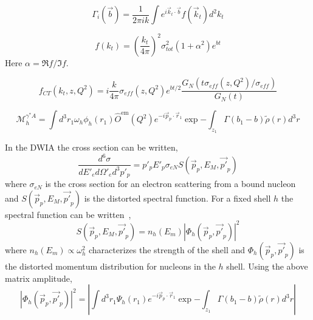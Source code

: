 \begin{equation}
    \Gamma_i(\vec{b}) = \frac{1}{2\pi i k}
                  \int e^{i\vec{k}_t \cdot \vec{b}} f(\vec{k}_t) d^2k_t
\end{equation}

\begin{equation}
    f(k_t) = \left(\frac{k_t}{4\pi}\right)^2
             \sigma_{tot}^2
             (1+\alpha^2) e^{bt}
\end{equation}
Here $\alpha=\Re{f}/\Im{f}$.

\begin{equation}
    f_{CT}(k_t, z, Q^2) = i\frac{k}{4\pi} \sigma_{eff}(z,Q^2) e^{bt/2}
                          \frac{G_N\left( t \sigma_{eff}(z,Q^2)/\sigma_{eff} \right)}
                               {G_N\left( t \right)}
\end{equation}

\begin{equation}
    \mathcal{M}_{h}^{\gamma^*A} = \int d^3 r_1 \omega_h \phi_h\left(r_{1}\right)
                                  \hat{O}^{\mathrm{em}}\left(Q^{2}\right)
                                  e^{-i \vec{p}_p \cdot \vec{r}_1}
                                  \exp{- \int_{z_{1}}
                                  \Gamma\left(b_{1}-b\right) \tilde{\rho}(r) d^3 r}
\end{equation}

In the DWIA the cross section can be
written,
\begin{equation}
    \frac{d^6\sigma}{dE'_{e} d\Omega'_{e} d^3p'_{p}} = p'_p E'_p \sigma_{eN} S(\vec{p}_p, E_M, \vec{p'}_p)
\end{equation}
where $\sigma_{eN}$ is the cross section for an electron scattering from a
bound nucleon and $S(\vec{p}_p, E_M, \vec{p'}_p)$ is the distorted
spectral function.
For a fixed shell $h$ the spectral function can be written~\cite{Frullani_1984},
\begin{equation}
    S(\vec{p}_p, E_M, \vec{p'}_p) = n_h(E_m) |\Phi_h(\vec{p}_p, \vec{p'}_p)|^2
\end{equation}
where $n_h(E_m)\propto\omega_h^2$ characterizes the strength of the shell and
$\Phi_h(\vec{p}_p, \vec{p'}_p)$ is the distorted momentum distribution for
nucleons in the $h$ shell.
Using the above matrix amplitude,
\begin{equation}
    \left| \Phi_h(\vec{p}_p, \vec{p'}_p)\right|^2
        = \left|
            \int d^3 r_1 \Psi_h(r_1) e^{-i \vec{p}_p \cdot \vec{r}_1}
            \exp{- \int_{z_{1}} \Gamma\left(b_{1}-b\right) \tilde{\rho}(r) d^3 r}
          \right|
\end{equation}

